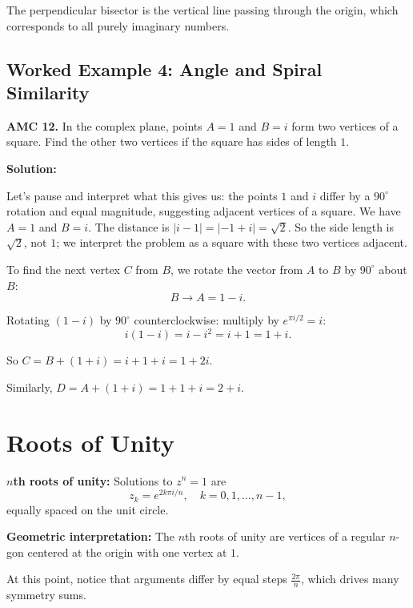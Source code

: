 \documentclass[12pt]{extarticle}
\begin{document}
The perpendicular bisector is the vertical line passing through the origin, which corresponds to all purely imaginary numbers.


\subsection*{Worked Example 4: Angle and Spiral Similarity}

\begin{examplebox}
\textbf{AMC 12.} In the complex plane, points $A = 1$ and $B = i$ form two vertices of a square. Find the other two vertices if the square has sides of length $1$.
\end{examplebox}

\textbf{Solution:}

Let’s pause and interpret what this gives us: the points $1$ and $i$ differ by a $90^\circ$ rotation and equal magnitude, suggesting adjacent vertices of a square.
We have $A = 1$ and $B = i$. The distance is $|i - 1| = |-1 + i| = \sqrt{2}$. So the side length is $\sqrt{2}$, not $1$; we interpret the problem as a square with these two vertices adjacent.

To find the next vertex $C$ from $B$, we rotate the vector from $A$ to $B$ by $90^\circ$ about $B$:
\[
B \to A = 1 - i.
\]

Rotating $(1 - i)$ by $90^\circ$ counterclockwise: multiply by $e^{\pi i/2} = i$:
\[
i(1 - i) = i - i^2 = i + 1 = 1 + i.
\]

So $C = B + (1 + i) = i + 1 + i = 1 + 2i$.

Similarly, $D = A + (1 + i) = 1 + 1 + i = 2 + i$.


\section{Roots of Unity}

\textbf{$n$th roots of unity:} Solutions to $z^n = 1$ are
\[
 z_k = e^{2k\pi i/n}, \quad k=0,1,\dots,n-1,
\]
 equally spaced on the unit circle.

\textbf{Geometric interpretation:} The $n$th roots of unity are vertices of a regular $n$-gon centered at the origin with one vertex at $1$.

At this point, notice that arguments differ by equal steps $\frac{2\pi}{n}$, which drives many symmetry sums.
\end{document}
